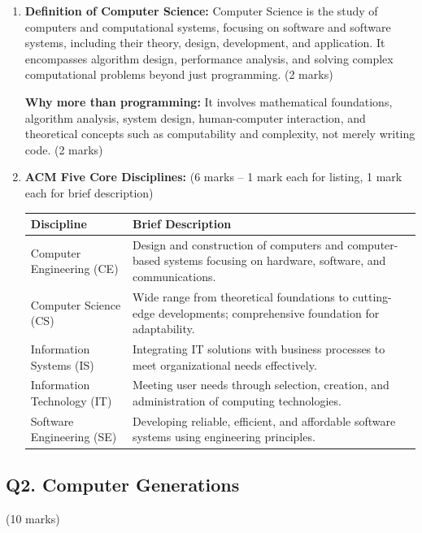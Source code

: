 \documentclass[12pt]{article}
\begin{document}
\begin{enumerate}[label=(\alph*)]
    \item \textbf{Definition of Computer Science:} Computer Science is the study of computers and computational systems, focusing on software and software systems, including their theory, design, development, and application. It encompasses algorithm design, performance analysis, and solving complex computational problems beyond just programming. \hfill (2 marks)

    \textbf{Why more than programming:} It involves mathematical foundations, algorithm analysis, system design, human-computer interaction, and theoretical concepts such as computability and complexity, not merely writing code. \hfill (2 marks)

    \item \textbf{ACM Five Core Disciplines:} \hfill (6 marks -- 1 mark each for listing, 1 mark each for brief description)

    \begin{center}
    \begin{tabular}{|p{4cm}|p{9cm}|}
        \hline
        \textbf{Discipline} & \textbf{Brief Description} \\
        \hline
        Computer Engineering (CE) & Design and construction of computers and computer-based systems focusing on hardware, software, and communications. \\
        Computer Science (CS) & Wide range from theoretical foundations to cutting-edge developments; comprehensive foundation for adaptability. \\
        Information Systems (IS) & Integrating IT solutions with business processes to meet organizational needs effectively. \\
        Information Technology (IT) & Meeting user needs through selection, creation, and administration of computing technologies. \\
        Software Engineering (SE) & Developing reliable, efficient, and affordable software systems using engineering principles. \\
        \hline
    \end{tabular}
    \end{center}
\end{enumerate}

\bigskip

\subsection*{Q2. Computer Generations} \hfill (10 marks)
\end{document}
